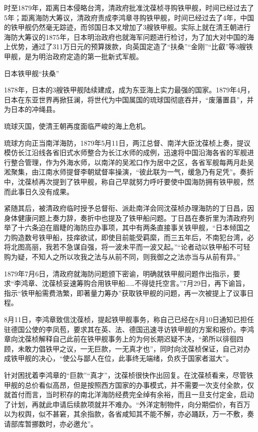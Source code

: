 \documentclass[12pt,UTF8]{ctexbook}
\begin{document}
时至1879年，距离日本侵略台湾，清政府批准沈葆桢寻购铁甲舰，时间已经过去了5年；距离海防大筹议，清政府责成李鸿章寻购铁甲舰，时间已经过去了4年，中国的铁甲舰仍然毫无踪迹，而邻国日本又增加了3艘铁甲舰。实际上就在清王朝进行海防大筹议的1875年，日本明治政府也就海军问题进行检讨，为了加大对中国的海上优势，通过了311万日元的预算拨款，向英国定造了“扶桑”“金刚”“比叡”等3艘铁甲舰，是为明治政府定造的第一批新式军舰。

日本铁甲舰“扶桑”

1878年，日本的3艘铁甲舰陆续建成，成为东亚海上实力最强的国家。1879年4月，日本在东亚世界再掀狂澜，将世代为中国属国的琉球国彻底吞并，“废藩置县”，并为日本的冲绳县。

琉球灭国，使清王朝再度面临严峻的海上危机。

琉球方向正当南洋海防，1879年5月11日，两江总督、南洋大臣沈葆桢上奏，提议模仿长江沿线各省旧式水师整合为长江水师的成例，迅速将中国沿海各省的军舰进行整合管理，作为外海水师，以南洋的吴淞口作为居中之区，各省军舰每两月赴吴淞聚集，由江南水师提督李朝斌督率操演，“彼此联为一气，缓急乃有足凭”。奏折中，沈葆桢再次提到了铁甲舰，称自己早就努力呼吁要使中国海防拥有铁甲舰，然而此事日久没有成果。

紧随其后，被清政府临时授予总督衔、派赴南洋会同沈葆桢办理海防的丁日昌，因身体健康问题上奏力辞，奏折中也提及了铁甲船问题。丁日昌在奏折里为清政府列举了十六条迫在眉睫的海防应办事项，其中有两条直接事关铁甲舰，“日本倾国之力购造数号铁甲船，技痒欲试，即使目前能受羁縻，而三五年后，不南犯台湾，必将北图高丽，我若不急谋自强，将一波未平而一波又起。”“论者动以铁甲船不可轻购为疑，不知人之所以攻我之法与从前不同，则我御之之法亦当与从前有异。”

1879年7月6日，清政府就海防问题颁下密谕，明确就铁甲舰问题作出指示，要求“李鸿章、沈葆桢妥速筹购合用铁甲船……不得徒托空言。”7月29日，再下谕旨，指示“铁甲船需费浩繁，即著量力筹办”获取铁甲舰的问题，再一次被提上了议事日程。

8月11日，李鸿章致信沈葆桢，提起铁甲舰事务，称自己已经在8月10日通知已担任驻德国公使的李凤苞，要求其在英、法、德国迅速寻访铁甲舰的方案和报价。李鸿章向沈葆桢解释自己此前在铁甲舰事务上的为何长期迟疑不决，“弟所以徘徊四顾，未敢力倡铁甲之议，一无巨款，一无真才也”，同时向沈葆桢保证，自己对办成铁甲舰的决心，“使公与鄙人在位，此事终无端绪，负疚于国家者滋大”。

针对困扰着李鸿章的“巨款”“真才”，沈葆桢很快作出回复。在沈葆桢看来，尽管铁甲舰的总价看似高昂，但是按照西方国家的办事模式，并不需要一次支付全款，仅就首付而言，当时积存的南北洋海防经费完全绰有余裕，而且一旦支付定金，启动了计划，再就此申请后续款项就并不难办。“外洋定制物件，向分期偿价，有百万以为权舆，似不甚窘，其余指款，各省咸知其不能不解，亦必踊跃，万一不敷，奏请部库暂挪数时，亦必邀允”。
\end{document}
